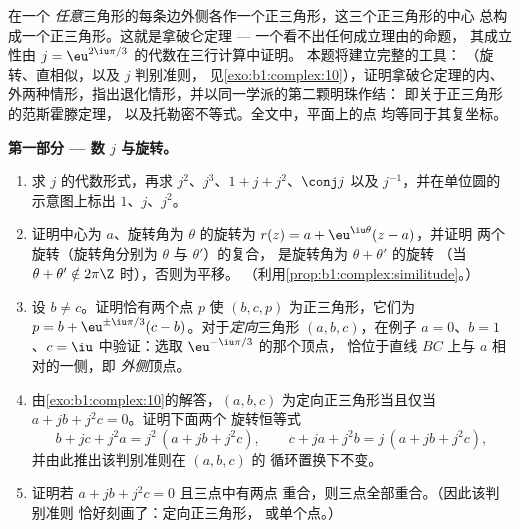 \begin{problem}\label{pb:b1:complex:1}
在一个
\emph{任意}三角形的每条边外侧各作一个正三角形，这三个正三角形的中心
总构成一个正三角形。这就是拿破仑定理
 --- 一个看不出任何成立理由的命题，
其成立性由 $j = \eu^{2\iu\pi/3}$ 的代数在三行计算中证明。
本题将建立完整的工具：
（旋转、直相似，以及 $j$ 判别准则，
见\cref{exo:b1:complex:10}），证明拿破仑定理的内、
外两种情形，指出退化情形，并以同一学派的第二颗明珠作结：
即关于正三角形的范斯霍滕定理，
以及托勒密不等式。全文中，平面上的点
均等同于其复坐标。

\medskip
\noindent\textbf{第一部分 --- 数 $j$ 与旋转。}
\begin{enumerate}
  \item 求 $j$ 的代数形式，再求 $j^2$、$j^3$、$1 + j
        + j^2$、$\conj j$ 以及 $j^{-1}$，并在单位圆的
        示意图上标出 $1$、$j$、$j^2$。
  \item 证明中心为 $a$、旋转角为 $\theta$ 的旋转为
        $r(z) = a + \eu^{\iu\theta}(z - a)$，并证明
        两个旋转（旋转角分别为 $\theta$ 与 $\theta'$）的复合，
        是旋转角为 $\theta + \theta'$ 的旋转
        （当 $\theta + \theta' \notin 2\pi\Z$ 时），否则为平移。
        （利用\cref{prop:b1:complex:similitude}。）
  \item 设 $b \neq c$。证明恰有两个点 $p$
        使 $(b, c, p)$ 为正三角形，它们为 $p = b +
        \eu^{\pm\iu\pi/3}(c - b)$。对于\emph{定向}三角形
        $(a, b, c)$，在例子 $a = 0$、$b = 1$、$c =
        \iu$ 中验证：选取 $\eu^{-\iu\pi/3}$ 的那个顶点，
        恰位于直线 $BC$ 上与 $a$ 相对的一侧，即
        \emph{外侧}顶点。
  \item 由\cref{exo:b1:complex:10}的解答，$(a, b, c)$
        为定向正三角形当且仅当 $a + jb + j^2c = 0$。证明下面两个
        旋转恒等式
        \[
        b + jc + j^2a = j^2\,(a + jb + j^2c),
        \qquad
        c + ja + j^2b = j\,(a + jb + j^2c),
        \]
        并由此推出该判别准则在 $(a, b, c)$ 的
        循环置换下不变。
  \item 证明若 $a + jb + j^2c = 0$ 且三点中有两点
        重合，则三点全部重合。（因此该判别准则
        恰好刻画了：定向正三角形，
        或单个点。）
\end{enumerate}


\end{problem}
